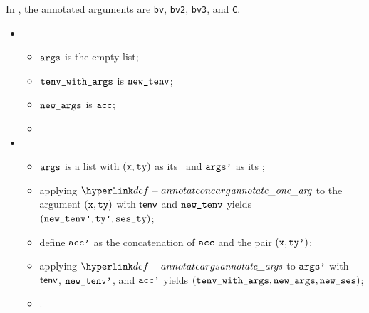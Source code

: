 In , the annotated arguments are
\texttt{bv}, \texttt{bv2}, \texttt{bv3}, and \texttt{C}.

\ProseParagraph
\OneApplies
\begin{itemize}
  \item {}
  \begin{itemize}
    \item $\texttt{args}$ is the empty list;
    \item $\texttt{tenv\_with\_args}$ is $\texttt{new\_tenv}$;
    \item $\texttt{new\_args}$ is $\texttt{acc}$;
    \item \Proseeqdef{$\vses$}{$\vsesin$}
  \end{itemize}

  \item {}
  \begin{itemize}
    \item $\texttt{args}$ is a list with $(\texttt{x}, \texttt{ty})$ as its \head\ and $\texttt{args'}$ as its \tail;
    \item applying $\annotateonearg$ to the argument $(\texttt{x}, \texttt{ty})$ with $\textsf{tenv}$ and $\texttt{new\_tenv}$ yields
          $(\texttt{new\_tenv'}, \texttt{ty'}, \texttt{ses\_ty})$\ProseOrTypeError;
    \item define $\texttt{acc'}$ as the concatenation of $\texttt{acc}$ and the pair $(\texttt{x}, \texttt{ty'})$;
    \item applying $\annotateargs$ to $\texttt{args'}$ with $\textsf{tenv}$, $\texttt{new\_tenv'}$, and $\texttt{acc'}$ yields $(\texttt{tenv\_with\_args}, \texttt{new\_args}, \texttt{new\_ses})$;
    \item {}.
  \end{itemize}
\end{itemize}

\FormallyParagraph
{}

